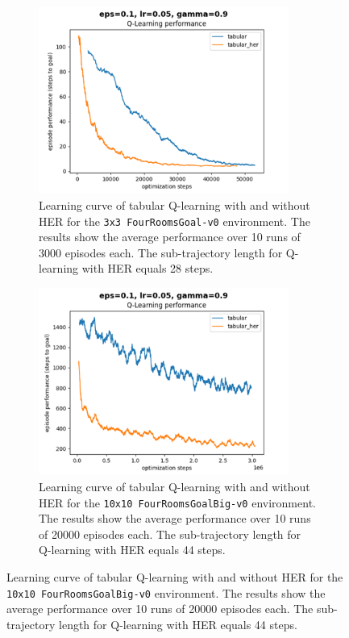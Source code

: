 \documentclass[conference]{IEEEtran}
\begin{document}
\begin{figure}[ht]
\centering
\begin{subfigure}[t]{0.45\textwidth}
\centering
\includegraphics[width=0.9\textwidth]{img/exp_tabular_her_fourroom_small.png}
\caption{Learning curve of tabular Q-learning with and without HER for the \texttt{3x3 FourRoomsGoal-v0} environment. The results show the average performance over 10 runs of 3000 episodes each. The sub-trajectory length for Q-learning with HER equals 28 steps.}
\label{fig:experiment_fourroomsgoal_learning_performance}
\end{subfigure}
\hspace{1em}
\begin{subfigure}[t]{0.45\textwidth}
\centering
\includegraphics[width=0.9\textwidth]{img/exp_tabular_her_fourroom_big.png}
\caption{Learning curve of tabular Q-learning with and without HER for the \texttt{10x10 FourRoomsGoalBig-v0} environment. The results show the average performance over 10 runs of 20000 episodes each. The sub-trajectory length for Q-learning with HER equals 44 steps.}

\end{subfigure}
\end{figure}
\end{document}
